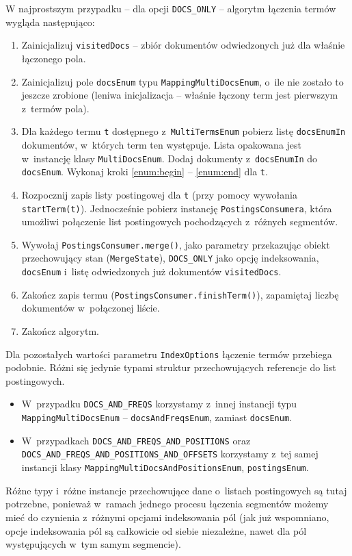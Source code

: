 W najprostszym przypadku -- dla opcji \texttt{DOCS\_ONLY} -- algorytm łączenia termów wygląda następująco:
\begin{enumerate}
 \item Zainicjalizuj \texttt{visitedDocs} -- zbiór dokumentów odwiedzonych już dla właśnie łączonego pola.
 \item Zainicjalizuj pole \texttt{docsEnum} typu \texttt{MappingMultiDocsEnum}, o~ile nie zostało to jeszcze zrobione (leniwa inicjalizacja -- właśnie łączony term jest pierwszym z~termów pola).
 \item Dla każdego termu \texttt{t} dostępnego z~\texttt{MultiTermsEnum} pobierz listę \texttt{docsEnumIn} dokumentów, w~których term ten występuje. Lista opakowana jest w~instancję klasy \texttt{MultiDocsEnum}. Dodaj dokumenty z~\texttt{docsEnumIn} do \texttt{docsEnum}. Wykonaj kroki \ref{enum:begin} -- \ref{enum:end} dla \texttt{t}.
 \item \label{enum:begin} Rozpocznij zapis listy postingowej dla \texttt{t} (przy pomocy wywołania \texttt{startTerm(t)}). Jednocześnie pobierz instancję \texttt{PostingsConsumera}, która umożliwi połączenie list postingowych pochodzących z~różnych segmentów.
 \item \label{alg:postingsConsumerMergeCall} Wywołaj \texttt{PostingsConsumer.merge()}, jako parametry przekazując obiekt przechowujący stan (\texttt{MergeState}), \texttt{DOCS\_ONLY} jako opcję indeksowania, \texttt{docsEnum} i~listę odwiedzonych już dokumentów \texttt{visitedDocs}.
 \item \label{enum:end} Zakończ zapis termu (\texttt{PostingsConsumer.finishTerm()}), zapamiętaj liczbę dokumentów w~połączonej liście.
 \item Zakończ algorytm.
\end{enumerate}

Dla pozostałych wartości parametru \texttt{IndexOptions} łączenie termów przebiega podobnie. Różni się jedynie typami struktur przechowujących referencje do list postingowych.
\begin{itemize}
 \item W~przypadku \texttt{DOCS\_AND\_FREQS} korzystamy z~innej instancji typu \\ \texttt{MappingMultiDocsEnum} -- \texttt{docsAndFreqsEnum}, zamiast \texttt{docsEnum}.
 \item W~przypadkach \texttt{DOCS\_AND\_FREQS\_AND\_POSITIONS} oraz \\ \texttt{DOCS\_AND\_FREQS\_AND\_POSITIONS\_AND\_OFFSETS} korzystamy z~tej samej instancji klasy \texttt{MappingMultiDocsAndPositionsEnum}, \texttt{postingsEnum}.
\end{itemize}
Różne typy i~różne instancje przechowujące dane o~listach postingowych są tutaj potrzebne, ponieważ w~ramach jednego procesu łączenia segmentów możemy mieć do czynienia z~różnymi opcjami indeksowania pól (jak już wspomniano, opcje indeksowania pól są całkowicie od siebie niezależne, nawet dla pól występujących w~tym samym segmencie).

